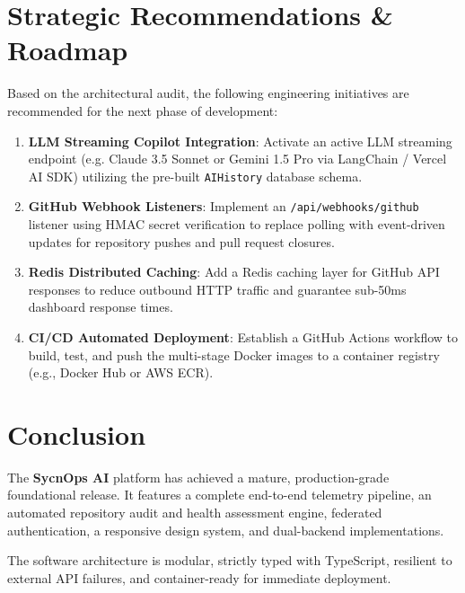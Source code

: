 \documentclass[11pt,a4paper]{article}
\begin{document}
\section{Strategic Recommendations \& Roadmap}

Based on the architectural audit, the following engineering initiatives are recommended for the next phase of development:

\begin{enumerate}[leftmargin=1.5em]
    \item \textbf{LLM Streaming Copilot Integration}: Activate an active LLM streaming endpoint (e.g. Claude 3.5 Sonnet or Gemini 1.5 Pro via LangChain / Vercel AI SDK) utilizing the pre-built \texttt{AIHistory} database schema.
    \item \textbf{GitHub Webhook Listeners}: Implement an \texttt{/api/webhooks/github} listener using HMAC secret verification to replace polling with event-driven updates for repository pushes and pull request closures.
    \item \textbf{Redis Distributed Caching}: Add a Redis caching layer for GitHub API responses to reduce outbound HTTP traffic and guarantee sub-50ms dashboard response times.
    \item \textbf{CI/CD Automated Deployment}: Establish a GitHub Actions workflow to build, test, and push the multi-stage Docker images to a container registry (e.g., Docker Hub or AWS ECR).
\end{enumerate}

\section{Conclusion}

The \textbf{SycnOps AI} platform has achieved a mature, production-grade foundational release. It features a complete end-to-end telemetry pipeline, an automated repository audit and health assessment engine, federated authentication, a responsive design system, and dual-backend implementations. 

The software architecture is modular, strictly typed with TypeScript, resilient to external API failures, and container-ready for immediate deployment.
\end{document}
